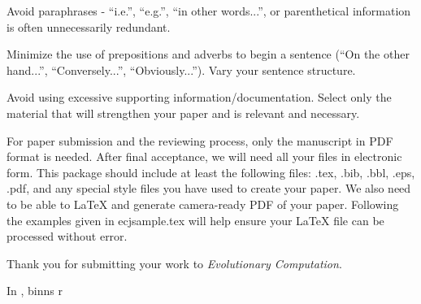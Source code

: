 \documentclass[twoside]{article}
\begin{document}
Avoid paraphrases - ``i.e.'', ``e.g.'', ``in other words...'', or 
parenthetical information is often unnecessarily redundant.

Minimize the use of prepositions and adverbs to begin a sentence (``On the other hand...'', ``Conversely...'', ``Obviously...'').  Vary your sentence 
structure.

Avoid using excessive supporting information/documentation.  Select only the 
material that will strengthen your paper and is relevant and necessary.

For paper submission and the reviewing process, only the manuscript in 
PDF format is needed. After final acceptance, we will need all your files 
in electronic form.  This package should include at least the following 
files:  .tex, .bib, .bbl, .eps, .pdf, and any 
special style files you have used to create your paper.  We also need to be 
able to \LaTeX{} and generate camera-ready PDF of your paper. Following 
the examples given in ecjsample.tex will help ensure your \LaTeX{} file can be 
processed without error.

Thank you for submitting your work to {\em Evolutionary Computation}.

In \cite{ABELLAN20171} , binns \cite{Binns:2017} r




\end{document}
